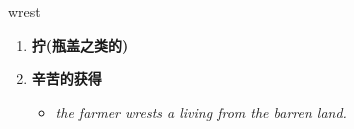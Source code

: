 
\begin{frame}
{\huge wrest}
\begin{center}
\begin{enumerate}\Large
  \item \textbf{拧(瓶盖之类的)}
  \item \textbf{辛苦的获得}
  \begin{itemize}
    \item \em{\Large{the farmer wrests a living from the barren land.}}
  \end{itemize}
\end{enumerate}
\end{center}
\end{frame}
